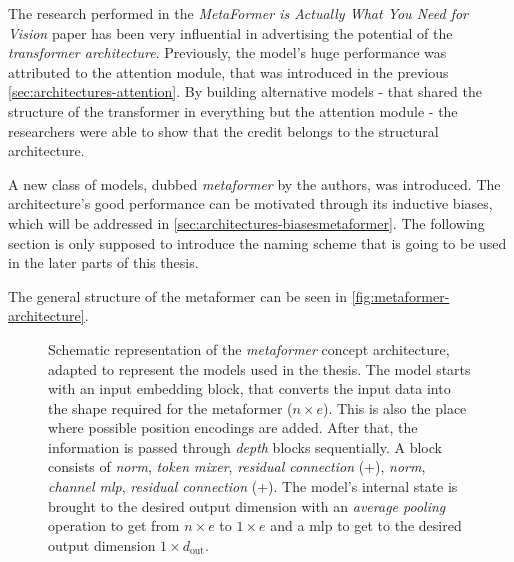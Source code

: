 The research performed in the \emph{MetaFormer is Actually What You Need for Vision} paper \cite{metaformerPaper} has been very influential in advertising the potential of the \emph{transformer architecture}.
Previously, the model's huge performance was attributed to the attention module, that was introduced in the previous \autoref{sec:architectures-attention}. 
By building alternative models - that shared the structure of the transformer in everything but the attention module - the researchers were able to show that the credit belongs to the structural architecture.

A new class of models, dubbed \emph{metaformer} by the authors, was introduced. 
The architecture's good performance can be motivated through its inductive biases, which will be addressed in \autoref{sec:architectures-biasesmetaformer}.
The following section is only supposed to introduce the naming scheme that is going to be used in the later parts of this thesis.

The general structure of the metaformer can be seen in \autoref{fig:metaformer-architecture}.

\begin{figure}[htbp]
    \centering
    \caption{Schematic representation of the \emph{metaformer} concept architecture, adapted to represent the models used in the thesis. 
    The model starts with an input embedding block, that converts the input data into the shape required for the metaformer ($n\times e$). This is also the place where possible position encodings are added. 
    After that, the information is passed through \emph{depth} blocks sequentially. 
    A block consists of \emph{norm}, \emph{token mixer}, \emph{residual connection} (+), 
    \emph{norm}, \emph{channel mlp}, \emph{residual connection} (+).
    The model's internal state is brought to the desired output dimension with an \emph{average pooling} operation to get from $n \times e$ to $1 \times e$ and a mlp to get to the desired output dimension $1 \times d_\mathrm{out}$.
    }
    \label{fig:metaformer-architecture}
\end{figure}

